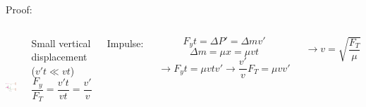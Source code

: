\documentclass[]{beamer}
\begin{document}
\begin{frame}

\textcolor{mypink1}{Proof:}




   \begin{columns}[c]
   \column{2.5in}  %

 \begin{center}
  \includegraphics[height=1.5in]{images4/6.jpg}
\end{center}

  \pause
Small vertical displacement ($v't\ll vt$)
\pause
\begin{equation*}
\frac{F_y}{F_T}=\frac{v't}{vt}=\frac{v'}{v}
\end{equation*}
\pause

Impulse:

 \begin{equation*}
F_y t=\Delta P'=\Delta mv'
\end{equation*}
\pause
\begin{equation*}
\Delta m=\mu x=\mu vt
\end{equation*}
\pause
\begin{equation*}
\rightarrow F_y t=\mu vtv' \rightarrow \frac{v'}{v}F_T=\mu vv'
\end{equation*}
\pause

\begin{equation}
\rightarrow v=\sqrt{\frac{F_T}{\mu}}
\end{equation}

   \end{columns}



  \end{frame}



\end{document}
